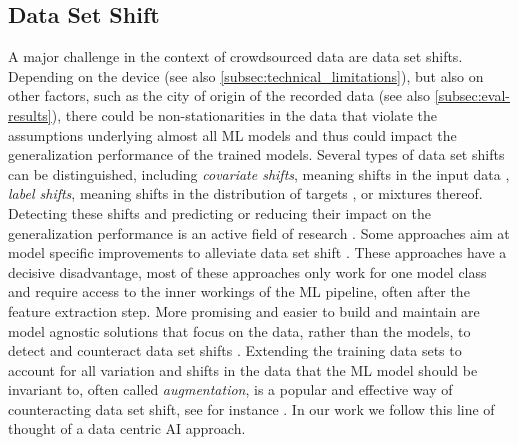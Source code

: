 \subsection{Data Set Shift}
\label{subsec:data_set_shift}
A major challenge in the context of crowdsourced data are data set shifts. Depending on the device (see also \autoref{subsec:technical_limitations}), but also on other factors, such as the city of origin of the recorded data (see also \autoref{subsec:eval-results}), there could be non-stationarities in the data that violate the assumptions underlying almost all ML models and thus could impact the generalization performance of the trained models. Several types of data set shifts can be distinguished, including \textit{covariate shifts}, meaning shifts in the input data \cite{sugiyama_machine_2012}, \textit{label shifts}, meaning shifts in the distribution of targets \cite{lipton_detecting_2018}, or mixtures thereof. Detecting these shifts \cite{polyzotis_data_2018, rabanser_failing_2018, breck_data_2019, abdar_review_2021, bates_testing_2021} and predicting \cite{schelter_learning_2020} or reducing their impact on the generalization performance is an active field of research \cite{schelter_challenges_2018, biessmann_automated_2021}. Some approaches aim at model specific improvements to alleviate data set shift \cite{sugiyama_machine_2012}. These approaches have a decisive disadvantage, most of these approaches only work for one model class and require access to the inner workings of the ML pipeline, often after the feature extraction step. More promising and easier to build and maintain are model agnostic solutions that focus on the data, rather than the models, to detect and counteract data set shifts \cite{biessmann_automated_2021}. Extending the training data sets to account for all variation and shifts in the data that the ML model should be invariant to, often called \textit{augmentation}, is a popular and effective way of counteracting data set shift, see for instance \cite{cubuk_autoaugment_2019}. In our work we follow this line of thought of a data centric AI approach. 


